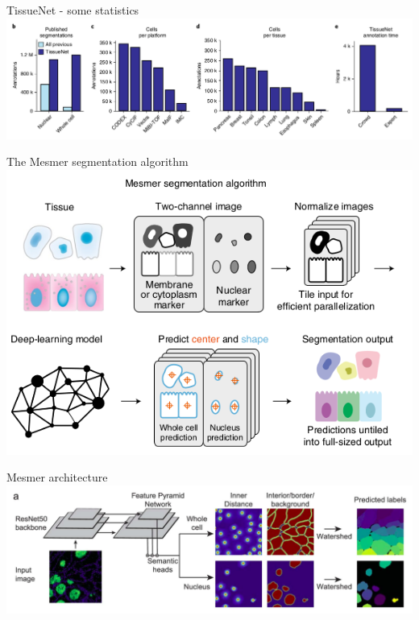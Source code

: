 \documentclass[9pt, aspectratio=169]{beamer}
\begin{document}
\begin{frame}
    {TissueNet - some statistics}
    \centering
    \includegraphics[width=\textwidth]{Greenwald2021_stats.png}
\end{frame}

\begin{frame}
    {The Mesmer segmentation algorithm}
    \centering
    \includegraphics[width=.8\textwidth]{Greenwald2021_Mesmer_method.png}
\end{frame}

\begin{frame}
    {Mesmer architecture}
    \centering
    \includegraphics[width=\textwidth]{Greenwald2021_architecture.png}
\end{frame}
\end{document}
